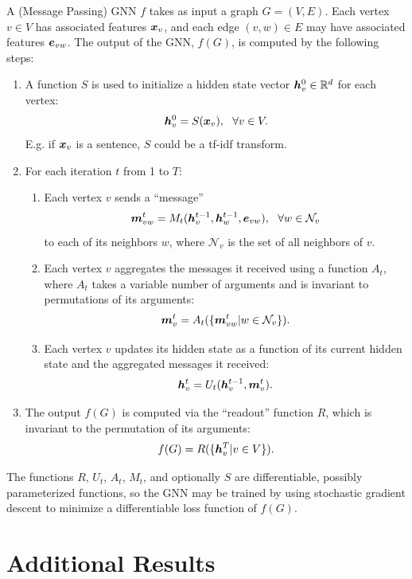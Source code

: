 \documentclass{article}
\begin{document}
A (Message Passing) GNN $f$ takes as input a graph $G = (V,E)$.  Each vertex $v \in V$ has associated features ${\bm{x}}_v$, and each edge $(v,w) \in E$ may have associated features ${\bm{e}}_{vw}$.  The output of the GNN, $f(G)$, is computed by the following steps:

\begin{enumerate}
\item A function $S$ is used to initialize a hidden state vector ${\bm{h}}_v^0 \in \mathbb{R}^d$ for each vertex:
\[
{\bm{h}}_v^0 = S({\bm{x}}_v), \ \ \forall v \in V.
\]
E.g. if ${\bm{x}}_v$ is a sentence, $S$ could be a tf-idf transform.
\item For each iteration $t$ from 1 to $T$:
    \begin{enumerate}
    \item Each vertex $v$ sends a ``message''
    \[
    {\bm{m}}_{vw}^{t} = M_t({\bm{h}}_v^{t-1}, {\bm{h}}_w^{t-1}, {\bm{e}}_{vw}), \ \ \forall w \in \mathcal{N}_v
    \]
    to each of its neighbors $w$, where $\mathcal{N}_v$ is the set of all neighbors of $v$.
    \item Each vertex $v$ aggregates the messages it received using a function $A_t$, where $A_t$ takes a variable number of arguments and is invariant to permutations of its arguments:
    \[
    {\bm{m}}_v^{t} = A_t(\{{\bm{m}}_{vw}^{t} \vert w \in \mathcal{N}_v \}).
    \]
    \item Each vertex $v$ updates its hidden state as a function of its current hidden state and the aggregated messages it received:
    \[
    {\bm{h}}_v^{t} = U_t({\bm{h}}_{v}^{t-1}, {\bm{m}}_v^{t}).
    \]
    \end{enumerate}
\item The output $f(G)$ is computed via the ``readout'' function $R$, which is invariant to the permutation of its arguments:
\[
f(G) = R(\{ {\bm{h}}_v^{T} \vert v \in V \}).
\]
\end{enumerate}
    
The functions $R$, $U_t$, $A_t$, $M_t$, and optionally $S$ are differentiable, possibly parameterized functions, so the GNN may be trained by using stochastic gradient descent to minimize a differentiable loss function of $f(G)$.






\section{Additional Results}
\end{document}
